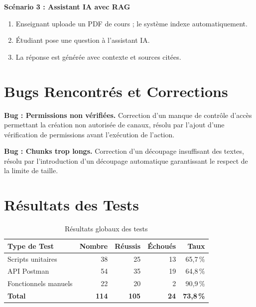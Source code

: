 \documentclass[12pt, a4paper, twoside]{report}
\newcommand{\cmark}{\ding{51}}
\begin{document}
\textbf{Scénario 3 : Assistant IA avec RAG}

\begin{enumerate}
  \item[\cmark] Enseignant uploade un PDF de cours ; le système indexe automatiquement. 
  \item[\cmark] Étudiant pose une question à l'assistant IA.
  \item[\cmark] La réponse est générée avec contexte et sources citées.
\end{enumerate}

\section{Bugs Rencontrés et Corrections}

\textbf{Bug : Permissions non vérifiées.} Correction d’un manque de contrôle d’accès permettant la création non autorisée de canaux, résolu par l’ajout d’une vérification de permissions avant l’exécution de l’action.

\textbf{Bug : Chunks trop longs.} Correction d’un découpage insuffisant des textes, résolu par l’introduction d’un découpage automatique garantissant le respect de la limite de taille.

\section{Résultats des Tests}

\begin{table}[H]

  \begin{tabularx}{\textwidth}{|X|r|r|r|r|}
    \hline
    \textbf{Type de Test} & \textbf{Nombre} & \textbf{Réussis} & \textbf{Échoués} & \textbf{Taux} \\
    \hline
    Scripts unitaires    & 38 & 25 & 13 & 65{,}7\,\% \\
    API Postman          & 54 & 35 & 19 & 64{,}8\,\% \\
    Fonctionnels manuels & 22 & 20 & 2 & 90{,}9\,\% \\
    \hline
    \textbf{Total}       & \textbf{114} & \textbf{105} & \textbf{24} & \textbf{73{,}8\,\%} \\
    \hline
  \end{tabularx}
    \caption{Résultats globaux des tests}
  \label{tab:test-results}
\end{table}
\end{document}
